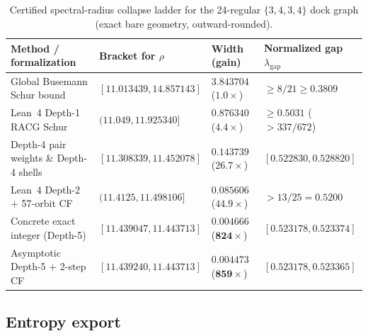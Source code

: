 \begin{table}[tb]
\centering
\caption{Certified spectral-radius collapse ladder for the 24-regular $\{3,4,3,4\}$ dock graph (exact bare geometry,
outward-rounded).}
\label{tab:spectral-ladder}
\small
\begin{tabularx}{\textwidth}{@{}>{\raggedright\arraybackslash}p{4.65cm}>{\raggedright\arraybackslash}p{3.90cm}>{\raggedright\arraybackslash}p{3.15cm}>{\raggedright\arraybackslash}X@{}}
\toprule
Method / formalization & Bracket for $\rho$ & Width (gain) & Normalized gap $\lambda_{\mathrm{gap}}$ \\
\midrule
Global Busemann Schur bound & $[11.013439, 14.857143]$ & $3.843704$ ($1.0\times$) & $\ge 8/21 \ge 0.3809$ \\
Lean~4 Depth-1 RACG Schur & $(11.049, 11.925340]$ & $0.876340$ ($4.4\times$) & $\ge 0.5031$ ($> 337/672$) \\
Depth-4 pair weights \& Depth-4 shells & $[11.308339, 11.452078]$ & $0.143739$ ($26.7\times$) & $[0.522830, 0.528820]$ \\
Lean~4 Depth-2 + 57-orbit CF & $(11.4125, 11.498106]$ & $0.085606$ ($44.9\times$) & $> 13/25 = 0.5200$ \\
Concrete exact integer (Depth-5) & $\mathbf{[11.439047, 11.443713]}$ & $\mathbf{0.004666}$ ($\mathbf{824\times}$) & $[0.523178, 0.523374]$ \\
Asymptotic Depth-5 + 2-step CF & $\mathbf{[11.439240, 11.443713]}$ & $\mathbf{0.004473}$ ($\mathbf{859\times}$) & $[0.523178, 0.523365]$ \\
\bottomrule
\end{tabularx}
\end{table}

\subsection{Entropy export}

